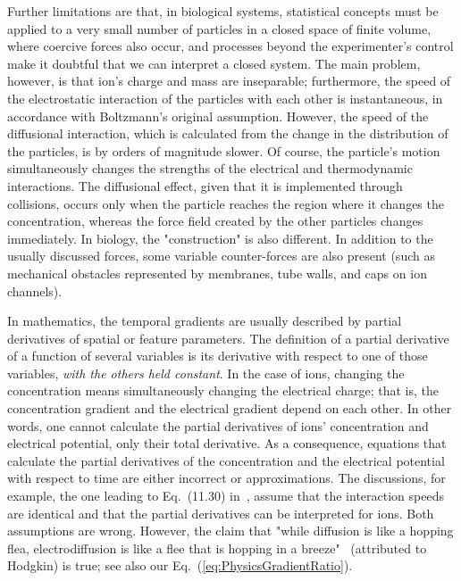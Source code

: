 Further limitations are that, in biological systems, statistical concepts must be applied to a very small number of particles in a closed space of finite volume, where coercive forces also occur, and processes beyond the experimenter's control make it doubtful that we can interpret a closed system. The main problem, however, is that ion's charge and mass are inseparable; furthermore, the speed of the electrostatic interaction of the particles with each other is instantaneous, in accordance with Boltzmann's original assumption. However, the speed of the diffusional interaction, which is calculated from the change in the distribution of the particles, is by orders of magnitude slower. Of course, the particle's motion simultaneously changes the strengths of the electrical and thermodynamic interactions. The diffusional effect, given that it is implemented through collisions, occurs only when the particle reaches the region where it changes the concentration, whereas the force field created by the other particles changes immediately.
In biology, the "construction" is also different. In addition to the usually discussed forces, some variable
counter-forces are also present (such as mechanical obstacles represented by membranes, tube walls, and caps on ion channels).

In mathematics, the temporal gradients are usually described by partial derivatives of
spatial or feature parameters.
The definition of a partial derivative of a function of several variables is its derivative with respect to one of those variables,
\textit{with the others held constant}. In the case of ions, changing the concentration means simultaneously changing the electrical charge; that is, the concentration gradient and the electrical gradient 
depend on each other.
In other words, one cannot calculate the partial derivatives of ions' concentration and electrical potential,
only their total derivative.
As a consequence, equations that calculate the partial derivatives of the concentration and the electrical potential with respect to time are either incorrect or approximations.
The discussions, for example, the one leading to
Eq.~(11.30) in~\cite{KochBiophysics:1999}, assume that the 
interaction speeds are identical and that the partial derivatives 
can be interpreted for ions. Both assumptions are wrong. However,
the claim that "while diffusion is like a hopping flea, electrodiffusion is
like a flee that is hopping in a breeze"~\cite{KochBiophysics:1999} (attributed to Hodgkin) is true; see also our Eq.~(\ref{eq:PhysicsGradientRatio}).


